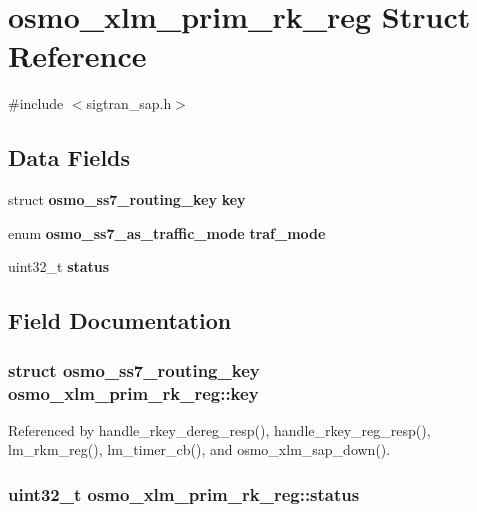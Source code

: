 \section{osmo\+\_\+xlm\+\_\+prim\+\_\+rk\+\_\+reg Struct Reference}
\label{structosmo__xlm__prim__rk__reg}


{\ttfamily \#include $<$sigtran\+\_\+sap.\+h$>$}

\subsection*{Data Fields}
\begin{DoxyCompactItemize}
\item 
struct {\bf osmo\+\_\+ss7\+\_\+routing\+\_\+key} {\bf key}
\item 
enum {\bf osmo\+\_\+ss7\+\_\+as\+\_\+traffic\+\_\+mode} {\bf traf\+\_\+mode}
\item 
uint32\+\_\+t {\bf status}
\end{DoxyCompactItemize}


\subsection{Field Documentation}
\subsubsection[{key}]{\setlength{\rightskip}{0pt plus 5cm}struct {\bf osmo\+\_\+ss7\+\_\+routing\+\_\+key} osmo\+\_\+xlm\+\_\+prim\+\_\+rk\+\_\+reg\+::key}\label{structosmo__xlm__prim__rk__reg_aa794cf698238ba6cf336b62478f0e460}


Referenced by handle\+\_\+rkey\+\_\+dereg\+\_\+resp(), handle\+\_\+rkey\+\_\+reg\+\_\+resp(), lm\+\_\+rkm\+\_\+reg(), lm\+\_\+timer\+\_\+cb(), and osmo\+\_\+xlm\+\_\+sap\+\_\+down().

\subsubsection[{status}]{\setlength{\rightskip}{0pt plus 5cm}uint32\+\_\+t osmo\+\_\+xlm\+\_\+prim\+\_\+rk\+\_\+reg\+::status}\label{structosmo__xlm__prim__rk__reg_a7280f91e02cd6c6783b3e121d82093d5}


